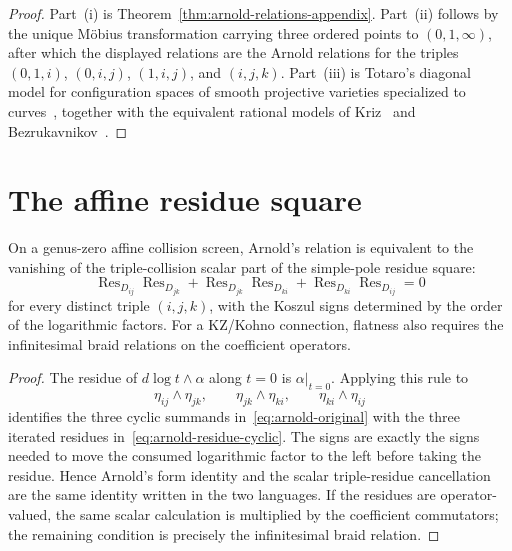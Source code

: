 \begin{proof}
Part~\textup{(i)} is Theorem~\ref{thm:arnold-relations-appendix}.
Part~\textup{(ii)} follows by the unique M\"obius transformation carrying
three ordered points to $(0,1,\infty)$, after which the displayed
relations are the Arnold relations for the triples
$(0,1,i)$, $(0,i,j)$, $(1,i,j)$, and $(i,j,k)$. Part~\textup{(iii)}
is Totaro's diagonal model for configuration spaces of smooth
projective varieties specialized to curves~\cite[Theorems~1 and~3]{Totaro96},
together with the equivalent rational models of
Kriz~\cite{Kriz94} and Bezrukavnikov~\cite{Bezrukavnikov94}.
\end{proof}

\section{The affine residue square}

\begin{proposition}
\label{prop:operadic-equivalence-arnold}
On a genus-zero affine collision screen, Arnold's relation is equivalent
to the vanishing of the triple-collision scalar part of the simple-pole
residue square:
\begin{equation}\label{eq:arnold-residue-cyclic}
\operatorname{Res}_{D_{ij}}\operatorname{Res}_{D_{jk}}
+\operatorname{Res}_{D_{jk}}\operatorname{Res}_{D_{ki}}
+\operatorname{Res}_{D_{ki}}\operatorname{Res}_{D_{ij}}=0
\end{equation}
for every distinct triple $(i,j,k)$, with the Koszul signs determined
by the order of the logarithmic factors. For a KZ/Kohno connection,
flatness also requires the infinitesimal braid relations on the
coefficient operators.
\end{proposition}

\begin{proof}
The residue of $d\log t\wedge\alpha$ along $t=0$ is
\(\alpha|_{t=0}\). Applying this rule to
\[
\eta_{ij}\wedge\eta_{jk},\qquad
\eta_{jk}\wedge\eta_{ki},\qquad
\eta_{ki}\wedge\eta_{ij}
\]
identifies the three cyclic summands in~\eqref{eq:arnold-original}
with the three iterated residues in~\eqref{eq:arnold-residue-cyclic}.
The signs are exactly the signs needed to move the consumed
logarithmic factor to the left before taking the residue. Hence
Arnold's form identity and the scalar triple-residue cancellation are
the same identity written in the two languages. If the residues are
operator-valued, the same scalar calculation is multiplied by the
coefficient commutators; the remaining condition is precisely the
infinitesimal braid relation.
\end{proof}

